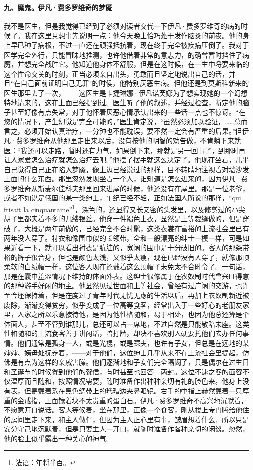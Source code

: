 \paragraph*{九、魔鬼。伊凡·费多罗维奇的梦魇}
\par 我不是医生，但是我觉得已经到了必须对读者交代一下伊凡·费多罗维奇的病的时候了。我在这里只想事先说明一点：他今天晚上恰巧处于发作脑炎的前夜。他的身上早已种了病根，不过一直还在顽强抵抗着，现在终于完全被疾病压倒了。我对于医学完全外行，只能冒昧地推测，也许他借着非常的意志力，的确曾暂时挡住了病魔，并想完全战胜它。他知道他身体不舒服，但是在这时候，在一生中将要来临的这个性命交关的时刻，正当必须亲自出头，勇敢而且坚定地说出自己的话，并且“在自己面前证明自己无罪”的时候，他特别厌恶生病。但他还是到莫斯科新来的医生那里去了一次，——这医生是卡捷琳娜·伊凡诺芙娜为了想实现她的一个幻想特地请来的，这在上面已经提到过。医生听了他的叙述，并经过检查，断定他的脑子甚至好像有点失常，对于他怀着厌恶心情承认出来的一些话一点也不惊讶。“在您的情况下，产生幻觉是完全可能的，”医生肯定说，“虽然必须加以验证，……总而言之，必须开始认真治疗，一分钟也不能耽误，要不然一定会有严重的后果。”但伊凡·费多罗维奇从他那里走出来以后，没有按他的明智的劝告做，不肯躺下来就医：“我还可以走路，暂时还有力气，如果倒下来，那就是另一回事了，到那时再让人家爱怎么治疗就怎么治疗去吧。”他摆了摆手就这么决定了。他现在坐着，几乎自己觉得自己正在陷入梦魇，像上边已经说过的那样，目不转睛地注视着对墙沙发上面的什么东西。那里忽然发现坐着一个人，谁知道是怎么进来的，因为伊凡·费多罗维奇从斯麦尔佳科夫那里回来进屋的时候，他还没有在屋里。那是一位老爷，或者不如说是俄国的某一类绅士，年纪已经不轻，正如法国人所说的那样，“qui frisait la cinquantaine”\footnote{法语：年将半百。}，深色的，还显得又长又密的头发里，以及修剪过的小尖胡子里都夹着不多的几缕银丝。他穿一件褐色上衣，显然是上等裁缝做的，但是穿破了，大概是两年前做的，已经完全不合时髦，这类衣裳在富裕的上流社会里已有两年没人穿了。衬衣和像围巾似的长领带，全和一般漂亮的绅士一模一样，可是如果近看一下，就可以看出衬衣是肮脏的，宽阔的围巾是十分破旧的。客人的那条带格的裤子很合身，但也是颜色太浅，又似乎太瘦，现在已经没有人穿了，就像那顶柔软的白绒帽一样，这位客人现在还戴着这么顶帽子未免太不合时令了。一句话，那是在囊中羞涩情况下维持的体面外表。这绅士很像属于在农奴制时代曾兴旺得意的那种游手好闲的地主。他显然见过世面和上等社会，曾经有过广阔的交游，也许至今还保持着，但是在度过了青年时代无忧无虑的生活以后，再加上农奴制新近被废除，渐渐变得贫穷，似乎变成了一位高等食客，经常出入于一些好心的老朋友家里，人家之所以乐意接待他，是因为他性格随和，易于相处，也因为他总还算是个体面人，甚至不管到谁那儿，总还可以占一席地，不过自然是只能敬陪末座。这类性格随和的上流食客善于讲闲话，陪打牌，却决不喜欢别人硬要托他们去办任何事情。他们通常是孤身一人，或是光棍，或是鳏夫，也许有子女，但总是在远地的某婶婶、姨母处抚养着，——对于他们，这位绅士几乎从来不在上流社会里提起，仿佛是有点为这样的亲戚害臊。他们逐渐地和子女们完全隔阂了，只是偶尔在过生日和圣诞节的时候得到他们的贺信，有时甚至也回答一两封。这位不速之客的面容不仅温厚而且随和，按照情况需要，随时准备作出种种亲切有礼的脸色来。他身上没有表，但是戴着系在黑色绸带上的玳瑁边夹鼻眼镜。右手的中指上赫然戴着一只厚重的金戒指，上面镶着块不太贵重的蛋白石。伊凡·费多罗维奇不高兴地沉默着，不愿意开口说话。客人等候着，坐在那里，正像一个食客，刚从楼上专门腾给他住的房间里走下来，和主人做伴，但因为主人正心里有事，皱眉想着什么，所以只是安分守己地沉默着，但是只要主人一开口，就随时准备作各种亲切的闲谈。忽然，他的脸上似乎露出一种关心的神气。
